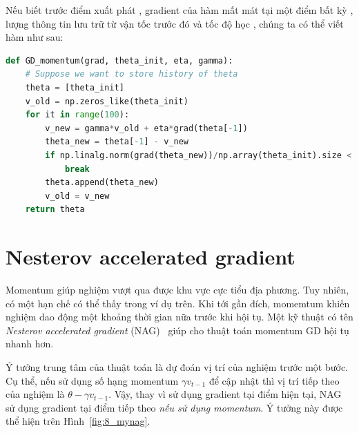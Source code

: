 Nếu biết trước điểm xuất phát , gradient của hàm mất mát tại
một điểm bất kỳ , lượng thông tin lưu trữ từ vận tốc
trước đó  và tốc độ học , chúng ta có thể
viết hàm  như sau:%
\newpage
\begin{lstlisting}[language=Python]
def GD_momentum(grad, theta_init, eta, gamma):
    # Suppose we want to store history of theta
    theta = [theta_init]
    v_old = np.zeros_like(theta_init)
    for it in range(100):
        v_new = gamma*v_old + eta*grad(theta[-1])
        theta_new = theta[-1] - v_new
        if np.linalg.norm(grad(theta_new))/np.array(theta_init).size < 1e-3:
            break
        theta.append(theta_new)
        v_old = v_new
    return theta
\end{lstlisting}


\section{Nesterov accelerated gradient}
Momentum giúp nghiệm vượt qua được khu vực cực tiểu địa phương. Tuy nhiên, có
một hạn chế có thể thấy trong ví dụ trên. Khi tới gần đích, momemtum khiến
nghiệm dao động một khoảng thời gian nữa trước khi hội tụ. Một kỹ thuật có tên
\textit{Nesterov accelerated gradient} (NAG)~\cite{nesterov2007gradient} giúp
cho thuật toán momentum GD hội tụ nhanh hơn.


Ý tưởng trung tâm của thuật toán là {dự đoán vị trí của nghiệm trước một bước}.
Cụ thể, nếu sử dụng số hạng {momentum} $\gamma v_{t-1}$ để cập nhật thì vị trí
tiếp theo của nghiệm là $\theta - \gamma v_{t-1}$. Vậy, thay vì sử dụng gradient
tại điểm hiện tại, NAG sử dụng gradient tại điểm tiếp theo \textit{nếu sử dụng
momentum}. Ý tưởng này được thể hiện trên Hình~\ref{fig:8_mynag}.


